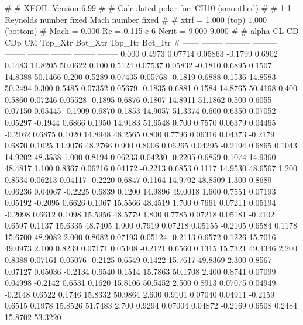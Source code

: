 #  
#       XFOIL         Version 6.99
#  
# Calculated polar for: CH10 (smoothed)                                 
#  
# 1 1 Reynolds number fixed          Mach number fixed         
#  
# xtrf =   1.000 (top)        1.000 (bottom)  
# Mach =   0.000     Re =     0.115 e 6     Ncrit =   9.000  9.000
#  
#   alpha    CL        CD       CDp       CM     Top_Xtr  Bot_Xtr  Top_Itr  Bot_Itr
#  ------ -------- --------- --------- -------- -------- -------- -------- --------
   0.000   0.4973   0.07714   0.05863  -0.1799   0.6902   0.1483  14.8205  50.0622
   0.100   0.5124   0.07537   0.05832  -0.1810   0.6895   0.1507  14.8388  50.1466
   0.200   0.5289   0.07435   0.05768  -0.1819   0.6888   0.1536  14.8583  50.2494
   0.300   0.5485   0.07352   0.05679  -0.1835   0.6881   0.1584  14.8765  50.4168
   0.400   0.5860   0.07246   0.05528  -0.1895   0.6876   0.1807  14.8911  51.1862
   0.500   0.6055   0.07150   0.05445  -0.1909   0.6870   0.1853  14.9057  51.3374
   0.600   0.6350   0.07052   0.05297  -0.1944   0.6866   0.1950  14.9183  51.6548
   0.700   0.7570   0.06379   0.04465  -0.2162   0.6875   0.1020  14.8948  48.2565
   0.800   0.7796   0.06316   0.04373  -0.2179   0.6870   0.1025  14.9076  48.2766
   0.900   0.8006   0.06265   0.04295  -0.2194   0.6865   0.1043  14.9202  48.3538
   1.000   0.8194   0.06233   0.04230  -0.2205   0.6859   0.1074  14.9360  48.4817
   1.100   0.8367   0.06216   0.04172  -0.2213   0.6853   0.1117  14.9530  48.6567
   1.200   0.8534   0.06213   0.04117  -0.2220   0.6847   0.1164  14.9702  48.8509
   1.300   0.8689   0.06236   0.04067  -0.2225   0.6839   0.1200  14.9896  49.0018
   1.600   0.7551   0.07193   0.05192  -0.2095   0.6626   0.1067  15.5566  48.4519
   1.700   0.7661   0.07211   0.05194  -0.2098   0.6612   0.1098  15.5956  48.5779
   1.800   0.7785   0.07218   0.05181  -0.2102   0.6597   0.1137  15.6335  48.7405
   1.900   0.7919   0.07218   0.05155  -0.2105   0.6584   0.1178  15.6700  48.9082
   2.000   0.8082   0.07193   0.05124  -0.2113   0.6572   0.1226  15.7016  49.0973
   2.100   0.8239   0.07171   0.05108  -0.2121   0.6560   0.1315  15.7321  49.4346
   2.200   0.8388   0.07161   0.05076  -0.2125   0.6549   0.1422  15.7617  49.8369
   2.300   0.8567   0.07127   0.05036  -0.2134   0.6540   0.1514  15.7863  50.1708
   2.400   0.8741   0.07099   0.04998  -0.2142   0.6531   0.1620  15.8106  50.5452
   2.500   0.8913   0.07075   0.04949  -0.2148   0.6522   0.1746  15.8332  50.9864
   2.600   0.9101   0.07040   0.04911  -0.2159   0.6515   0.1978  15.8526  51.7483
   2.700   0.9294   0.07004   0.04872  -0.2169   0.6508   0.2484  15.8702  53.3220
